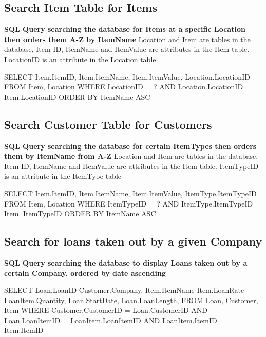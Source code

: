 \subsection{Search Item Table for Items}

\textbf{SQL Query searching the database for Items at a specific Location then orders them A-Z by ItemName}
Location and Item are tables in the database, Item ID, ItemName and ItemValue are attributes in the Item table. LocationID is an attribute in the Location table

\begin{sql}
    SELECT 
    Item.ItemID,
    Item.ItemName,
    Item.ItemValue,
    Location.LocationID
    FROM Item, Location
    WHERE LocationID = ? AND
    Location.LocationID = Item.LocationID
    ORDER BY ItemName ASC
\end{sql}

\subsection{Search Customer Table for Customers}

\textbf{SQL Query searching the database for certain ItemTypes then orders them by ItemName from A-Z}
Location and Item are tables in the database, Item ID, ItemName and ItemValue are attributes in the Item table. ItemTypeID is an attribute in the ItemType table

\begin{sql}
    SELECT 
    Item.ItemID,
    Item.ItemName,
    Item.ItemValue,
    ItemType.ItemTypeID
    FROM Item, Location
    WHERE ItemTypeID = ? AND
    ItemType.ItemTypeID = Item. ItemTypeID
    ORDER BY ItemName ASC
\end{sql}

\subsection{Search for loans taken out by a given Company}

\textbf{SQL Query searching the database to display Loans taken out by a certain Company, ordered by date ascending}

\begin{sql}
    SELECT
    Loan.LoanID
    Customer.Company,
    Item.ItemName
    Item.LoanRate
    LoanItem.Quantity,
    Loan.StartDate,
    Loan.LoanLength,
    FROM Loan, Customer, Item
    WHERE Customer.CustomerID = Loan.CustomerID AND Loan.LoanItemID = LoanItem.LoanItemID AND LoanItem.ItemID = Item.ItemID
\end{sql}


